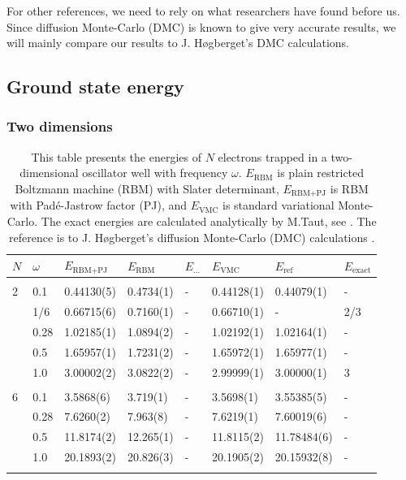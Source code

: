 For other references, we need to rely on what researchers have found before us. Since diffusion Monte-Carlo (DMC) is known to give very accurate results, we will mainly compare our results to J. Høgberget's DMC calculations. \cite{hogberget_quantum_2013}

\subsection{Ground state energy}

\subsubsection{Two dimensions}

\begin{table} [H]
	\caption{This table presents the energies of $N$ electrons trapped in a two-dimensional oscillator well with frequency $\omega$. $E_{\text{RBM}}$ is plain restricted Boltzmann machine (RBM) with Slater determinant, $E_{\text{RBM+PJ}}$ is RBM with Padé-Jastrow factor (PJ), and $E_{\text{VMC}}$ is standard variational Monte-Carlo. The exact energies are calculated analytically by M.Taut, see \cite{taut_two_1994}. The reference is to J. Høgberget's diffusion Monte-Carlo (DMC) calculations \cite{hogberget_quantum_2013}.} 
	\begin{tabularx}{\textwidth}{l:l|XXXXXX} \hline\hline
		\label{tab:quantumdotswinteraction2D}
		$N$ & $\omega$ & $E_{\text{RBM+PJ}}$ & $E_{\text{RBM}}$ & $E_{\text{...}}$ & $E_{\text{VMC}}$ & $E_{\text{ref}} $ & $E_{\text{exact}}$ \\ \hline \\
		2 & 0.1 & 0.44130(5) & 0.4734(1) & - & 0.44128(1) & 0.44079(1) & - \\ 
		& 1/6 & 0.66715(6) & 0.7160(1) & - & 0.66710(1) & - & 2/3 \\
		& 0.28 & 1.02185(1) & 1.0894(2) & - & 1.02192(1) & 1.02164(1) & - \\
		& 0.5 & 1.65957(1) & 1.7231(2) & - & 1.65972(1) & 1.65977(1)  & - \\
		& 1.0 & 3.00002(2) & 3.0822(2) & - & 2.99999(1) & 3.00000(1) & 3  \\ \hdashline \\

		6 & 0.1 & 3.5868(6) & 3.719(1) & - & 3.5698(1) & 3.55385(5) & - \\ 
		& 0.28 & 7.6260(2) & 7.963(8) & - & 7.6219(1) & 7.60019(6) & - \\
		& 0.5 & 11.8174(2) & 12.265(1) & - & 11.8115(2) & 11.78484(6) & - \\
		& 1.0 & 20.1893(2) & 20.826(3) & - & 20.1905(2) & 20.15932(8) & - \\ \hdashline \\
		

\end{tabularx}
\end{table}
